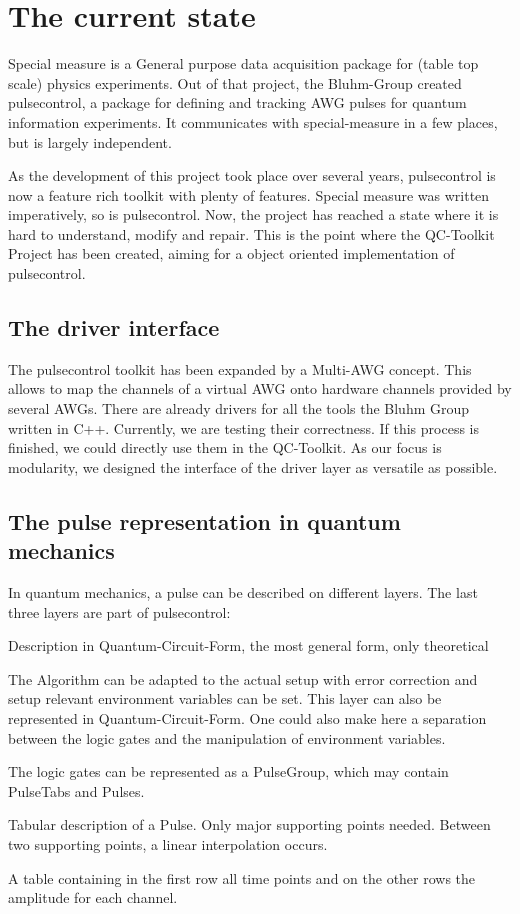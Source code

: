 \documentclass[a4paper,12pt]{article}
\begin{document}
\section{The current state}

Special measure is a General purpose data acquisition package for (table top scale) physics experiments. Out of that project, the Bluhm-Group created pulsecontrol, a package for defining and tracking AWG pulses for quantum information experiments. It communicates with special-measure in a few places, but is largely independent. 

As the development of this project took place over several years, pulsecontrol is now a feature rich toolkit with plenty of features. Special measure was written imperatively, so is pulsecontrol. Now, the project has reached a state where it is hard to understand, modify and repair. 
This is the point where the QC-Toolkit Project has been created, aiming for a object oriented implementation of pulsecontrol.

\subsection{The driver interface}
The pulsecontrol toolkit has been expanded by a Multi-AWG concept. This allows to map the channels of a virtual AWG onto hardware channels provided by several AWGs.
There are already drivers for all the tools the Bluhm Group written in C++. Currently, we are testing their correctness. If this process is finished, we could directly use them in the QC-Toolkit. 
As our focus is modularity, we designed the interface of the driver layer as versatile as possible.

\subsection{The pulse representation in quantum mechanics}
In quantum mechanics, a pulse can be described on different layers. The last three layers are part of pulsecontrol:
\begin{description} \itemsep-0.5pt
 \item[Algorithm:] Description in Quantum-Circuit-Form, the most general form, only theoretical
 \item[Optimized Algorithm:] The Algorithm can be adapted to the actual setup with error correction and setup relevant environment variables can be set.
 This layer can also be represented in Quantum-Circuit-Form. One could also make here a separation between the logic gates and the manipulation of environment variables.
 \item[PulseGroup:] The logic gates can be represented as a PulseGroup, which may contain PulseTabs and Pulses.
 \item[PulseTab:] Tabular description of a Pulse. Only major supporting points needed. Between two supporting points, a linear interpolation occurs.
 \item[Pulse:] A table containing in the first row all time points and on the other rows the amplitude for each channel.
\end{description}
\end{document}
